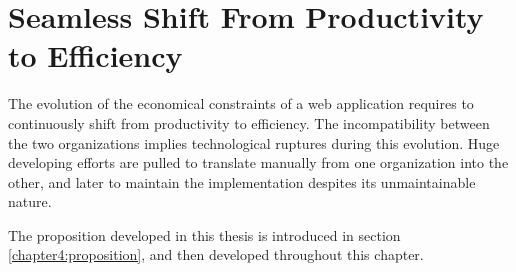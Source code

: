 \chapter{Seamless Shift From Productivity to Efficiency} \label{chapter4}
\minitoc
\eject

The evolution of the economical constraints of a web application requires to continuously shift from productivity to efficiency.
The incompatibility between the two organizations implies technological ruptures during this evolution.
Huge developing efforts are pulled to translate manually from one organization into the other, and later to maintain the implementation despites its unmaintainable nature.

The proposition developed in this thesis is introduced in section \ref{chapter4:proposition}, and then developed throughout this chapter.






% 